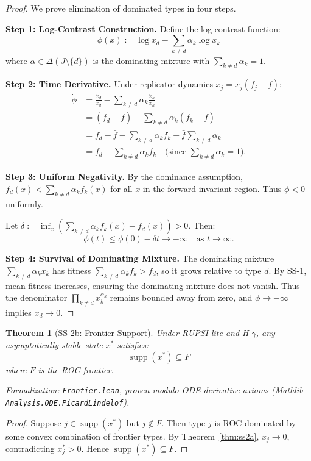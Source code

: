 \documentclass[12pt]{article}
\newtheorem{theorem}{Theorem}[section]
\DeclareMathOperator{\supp}{supp}
\begin{document}
\begin{proof}
We prove elimination of dominated types in four steps.

\textbf{Step 1: Log-Contrast Construction.}
Define the log-contrast function:
\[
\phi(x) := \log x_d - \sum_{k \neq d} \alpha_k \log x_k
\]
where $\alpha \in \Delta(J \setminus \{d\})$ is the dominating mixture with $\sum_{k \neq d} \alpha_k = 1$.

\textbf{Step 2: Time Derivative.}
Under replicator dynamics $\dot{x}_j = x_j(f_j - \bar{f})$:
\begin{align*}
\dot{\phi} &= \frac{\dot{x}_d}{x_d} - \sum_{k \neq d} \alpha_k \frac{\dot{x}_k}{x_k} \\
&= (f_d - \bar{f}) - \sum_{k \neq d} \alpha_k (f_k - \bar{f}) \\
&= f_d - \bar{f} - \sum_{k \neq d} \alpha_k f_k + \bar{f} \sum_{k \neq d} \alpha_k \\
&= f_d - \sum_{k \neq d} \alpha_k f_k \quad \text{(since $\sum_{k \neq d} \alpha_k = 1$)}.
\end{align*}

\textbf{Step 3: Uniform Negativity.}
By the dominance assumption, $f_d(x) < \sum_{k \neq d} \alpha_k f_k(x)$ for all $x$ in the forward-invariant region. Thus $\dot{\phi} < 0$ uniformly.

Let $\delta := \inf_x \left( \sum_{k \neq d} \alpha_k f_k(x) - f_d(x) \right) > 0$. Then:
\[
\phi(t) \leq \phi(0) - \delta t \to -\infty \quad \text{as } t \to \infty.
\]

\textbf{Step 4: Survival of Dominating Mixture.}
The dominating mixture $\sum_{k \neq d} \alpha_k x_k$ has fitness $\sum_{k \neq d} \alpha_k f_k > f_d$, so it grows relative to type $d$. By SS-1, mean fitness increases, ensuring the dominating mixture does not vanish. Thus the denominator $\prod_{k \neq d} x_k^{\alpha_k}$ remains bounded away from zero, and $\phi \to -\infty$ implies $x_d \to 0$.
\end{proof}

\begin{theorem}[SS-2b: Frontier Support]
\label{thm:ss2b}
Under RUPSI-lite and H-$\gamma$, any asymptotically stable state $x^*$ satisfies:
\[
\supp(x^*) \subseteq F
\]
where $F$ is the ROC frontier.
\end{theorem}
\noindent\textit{Formalization: \texttt{Frontier.lean}, proven modulo ODE derivative axioms (Mathlib \texttt{Analysis.ODE.PicardLindelof}).}

\begin{proof}
Suppose $j \in \supp(x^*)$ but $j \notin F$. Then type $j$ is ROC-dominated by some convex combination of frontier types. By Theorem~\ref{thm:ss2a}, $x_j \to 0$, contradicting $x^*_j > 0$. Hence $\supp(x^*) \subseteq F$.
\end{proof}
\end{document}

